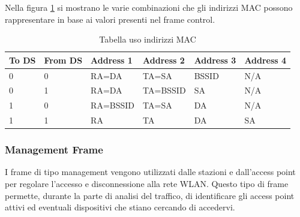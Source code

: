 Nella figura \ref{table:addressvalue} si mostrano le varie combinazioni che gli indirizzi MAC possono rappresentare in base ai valori presenti nel frame control.

\begin{table}[h]
\centering
\begin{tabular}{| l | l | l | l | l | l |}
	\hline 
	To DS  & From DS & Address 1 & Address 2 & Address 3 & Address 4\\ \hline
	 0 & 0 & RA=DA & TA=SA & BSSID & N/A \\ \hline
     0 & 1 & RA=DA & TA=BSSID & SA & N/A\\ \hline
	 1 & 0 & RA=BSSID & TA=SA & DA & N/A\\ \hline
	 1 & 1 & RA & TA & DA & SA\\ \hline
\end{tabular}
\centering
\caption{Tabella uso indirizzi MAC }
\label{table:addressvalue}
\end{table}


\newpage

\subsubsection{Management Frame}

I frame di tipo management vengono utilizzati dalle stazioni e dall'access point per regolare l'accesso e disconnessione alla rete WLAN.
Questo tipo di frame permette, durante la parte di analisi del traffico, di identificare gli access point  attivi ed eventuali dispositivi che stiano cercando di accedervi.

